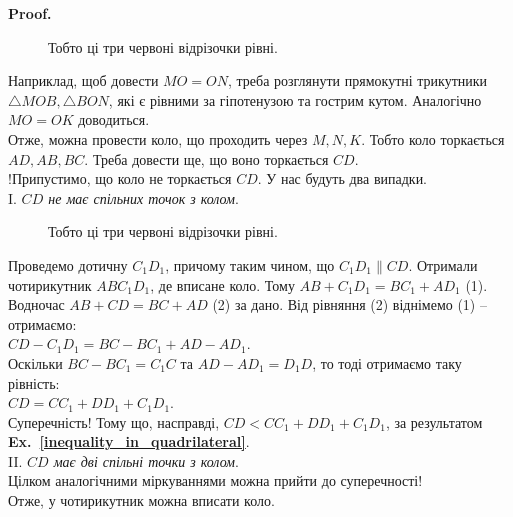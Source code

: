 \documentclass[a4paper, 10pt]{article}
\makeatletter
\def\qed{$\blacksquare$}
\theoremstyle{theoremdd}
\theoremstyle{theoremdd}
\theoremstyle{theoremdd}
\theoremstyle{theoremdd}
\theoremstyle{theoremdd}
\theoremstyle{theoremdd}
\theoremstyle{theoremdd}
\theoremstyle{theoremdd}
\theoremstyle{theoremdd}
\newcommand\exref[1]{\textbf{Ex.~\ref{#1}}}
\renewenvironment{proof}[1][Proof.\\]{\par
\pushQED{\hfill \qed}%
\normalfont \topsep6\p@\@plus6\p@\relax
\trivlist
\item\relax
{\bfseries
#1\@addpunct{.}}\hspace\labelsep\ignorespaces
}{%
\popQED\endtrivlist\@endpefalse
}
\makeatother
\begin{document}
\begin{proof}
\begin{figure}[H]
\caption*{Тобто ці три червоні відрізочки рівні.}
\end{figure}
Наприклад, щоб довести $MO = ON$, треба розглянути прямокутні трикутники $\triangle MOB, \triangle BON$, які є рівними за гіпотенузою та гострим кутом. Аналогічно $MO = OK$ доводиться.\\
Отже, можна провести коло, що проходить через $M,N,K$. Тобто коло торкається $AD,AB,BC$. Треба довести ще, що воно торкається $CD$.\\
!Припустимо, що коло не торкається $CD$. У нас будуть два випадки.\\
I. \textit{$CD$ не має спільних точок з колом}.\\
\begin{figure}[H]
\centering
{}
\caption*{Тобто ці три червоні відрізочки рівні.}
\end{figure}
Проведемо дотичну $C_1D_1$, причому таким чином, що $C_1 D_1 \parallel CD$. Отримали чотирикутник $ABC_1D_1$, де вписане коло. Тому $AB + C_1D_1 = BC_1 + AD_1$ (1). Водночас $AB + CD = BC + AD$ (2) за дано. Від рівняння (2) віднімемо (1) -- отримаємо:\\
$CD - C_1D_1 = BC - BC_1 + AD - AD_1$.\\
Оскільки $BC - BC_1 = C_1C$ та $AD - AD_1 = D_1D$, то тоді отримаємо таку рівність:\\
$CD = CC_1 + DD_1 + C_1D_1$.\\
Суперечність! Тому що, насправді, $CD < CC_1 + DD_1 + C_1D_1$, за результатом \exref{inequality_in_quadrilateral}.
\bigskip \\
II. \textit{$CD$ має дві спільні точки з колом}.\\
Цілком аналогічними міркуваннями можна прийти до суперечності!\\
Отже, у чотирикутник можна вписати коло.
\end{proof}
\newpage
\end{document}
